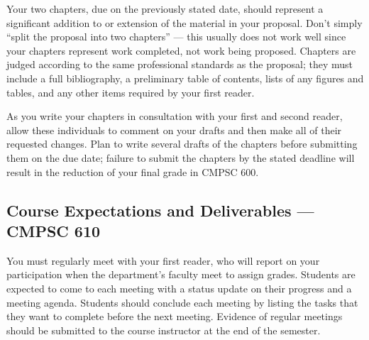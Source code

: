 % 
% 

\medskip
{} Your two chapters, due on the previously stated date, should represent a
significant addition to or extension of the material in your proposal. Don't simply ``split the proposal into two
chapters'' --- this usually does not work well since your chapters represent work completed, not work being proposed.
Chapters are judged according to the same professional standards as the proposal; they must include a full bibliography, a 
preliminary table of contents, lists of any figures and tables, and any other items required by your first reader.

As you write your chapters in consultation with your first and second reader, allow these individuals to comment on your
drafts and then make all of their requested changes.  Plan to write several drafts of the chapters before submitting them
on the due date; failure to submit the chapters by the stated deadline will result in the reduction of your final grade
in CMPSC 600.

\vspace*{-.2in}
\subsection*{Course Expectations and Deliverables --- CMPSC 610}

{} You must regularly meet with your first reader, who will report on your participation when
the department's faculty meet to assign grades.  Students are expected to come to each meeting with a status update on
their progress and a meeting agenda.  Students should conclude each meeting by listing the tasks that they want to
complete before the next meeting. Evidence of regular meetings should be submitted to the course instructor at the end
of the semester. 

% 



